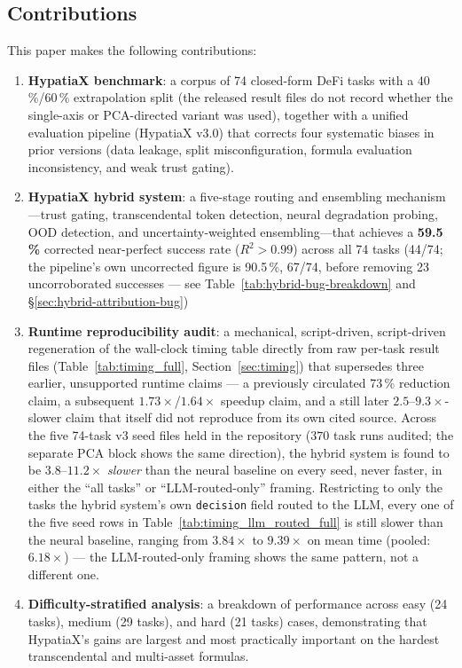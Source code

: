 \documentclass[twoside,11pt]{article}
\newcommand{\Rsq}{R^{2}}
\begin{document}
\subsection{Contributions}\label{subsec:contributions}
\label{sec:contributions}

This paper makes the following contributions:

\begin{enumerate}[leftmargin=2em,label=(\roman*)]
  \item \textbf{HypatiaX benchmark}: a corpus of 74 closed-form DeFi tasks
    with a 40\,\%/60\,\% extrapolation split (the released result files do not record whether the single-axis or PCA-directed variant was used), together
    with a unified evaluation pipeline (HypatiaX v3.0) that corrects four
    systematic biases in prior versions (data leakage, split misconfiguration,
    formula evaluation inconsistency, and weak trust gating).

  \item \textbf{HypatiaX hybrid system}: a five-stage routing and ensembling
    mechanism---trust gating, transcendental token detection, neural degradation
    probing, OOD detection, and uncertainty-weighted ensembling---that achieves
    a \textbf{59.5\,\%} corrected near-perfect success rate ($\Rsq>0.99$) across
    all 74 tasks (44/74; the pipeline's own uncorrected figure is 90.5\,\%, 67/74,
    before removing 23 uncorroborated successes --- see Table~\ref{tab:hybrid-bug-breakdown}
    and \S\ref{sec:hybrid-attribution-bug})

  \item \textbf{Runtime reproducibility audit}: a mechanical, script-driven,
    script-driven regeneration of the wall-clock timing table
    directly from raw per-task result files (Table~\ref{tab:timing_full},
    Section~\ref{sec:timing}) that supersedes three earlier, unsupported
    runtime claims --- a previously circulated 73\,\% reduction claim, a
    subsequent $1.73\times$/$1.64\times$ speedup claim, and a still later
    $2.5$--$9.3\times$-slower claim that itself did not reproduce from its
    own cited source. Across the five 74-task v3 seed files held in the
    repository ($370$ task runs audited; the separate PCA block shows the same
    direction), the hybrid
    system is found to be $3.8$--$11.2\times$ \emph{slower} than the neural
    baseline on every seed, never faster, in either the
    ``all tasks'' or ``LLM-routed-only'' framing. Restricting to only the
    tasks the hybrid system's own \texttt{decision} field routed to the LLM,
    every one of the five seed rows in Table~\ref{tab:timing_llm_routed_full}
    is still slower than the neural baseline, ranging from $3.84\times$ to
    $9.39\times$ on mean time (pooled: $6.18\times$)
    --- the LLM-routed-only framing shows the same pattern, not a different one.

  \item \textbf{Difficulty-stratified analysis}: a breakdown of performance across
    easy (24 tasks), medium (29 tasks), and hard (21 tasks) cases, demonstrating
    that HypatiaX's gains are largest and most practically important on the hardest
    transcendental and multi-asset formulas.
\end{enumerate}
\end{document}
